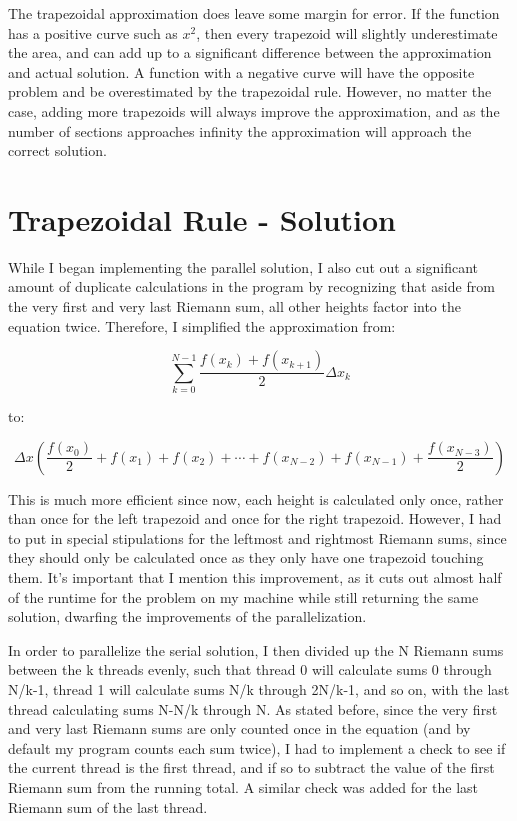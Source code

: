 \documentclass[a4paper]{article}
\begin{document}
The trapezoidal approximation does leave some margin for error. If the function has a positive curve such as $x^2$, then every trapezoid will slightly underestimate the area, and can add up to a significant difference between the approximation and actual solution. A function with a negative curve will have the opposite problem and be overestimated by the trapezoidal rule. However, no matter the case, adding more trapezoids will always improve the approximation, and as the number of sections approaches infinity the approximation will approach the correct solution.



\section{Trapezoidal Rule - Solution}

While I began implementing the parallel solution, I also cut out a significant amount of duplicate calculations in the program by recognizing that aside from the very first and very last Riemann sum, all other heights factor into the equation twice. Therefore, I simplified the approximation from:

\[ \sum_{k=0}^{N-1} \frac{f(x_k) + f(x_{k+1})}{2} \Delta x_k \]

\noindent
to:

\[ \Delta x (\frac{f(x_0)}{2} + f(x_1) + f(x_2) + \cdots + f(x_{N-2}) + f(x_{N-1}) + \frac{f(x_{N-3})}{2} )\]

\noindent
This is much more efficient since now, each height is calculated only once, rather than once for the left trapezoid and once for the right trapezoid. However, I had to put in special stipulations for the leftmost and rightmost Riemann sums, since they should only be calculated once as they only have one trapezoid touching them. It's important that I mention this improvement, as it cuts out almost half of the runtime for the problem on my machine while still returning the same solution, dwarfing the improvements of the parallelization.

In order to parallelize the serial solution, I then divided up the N Riemann sums between the k threads evenly, such that thread 0 will calculate sums 0 through N/k-1, thread 1 will calculate sums N/k through 2N/k-1, and so on, with the last thread calculating sums N-N/k through N. As stated before, since the very first and very last Riemann sums are only counted once in the equation (and by default my program counts each sum twice), I had to implement a check to see if the current thread is the first thread, and if so to subtract the value of the first Riemann sum from the running total. A similar check was added for the last Riemann sum of the last thread.
\end{document}
